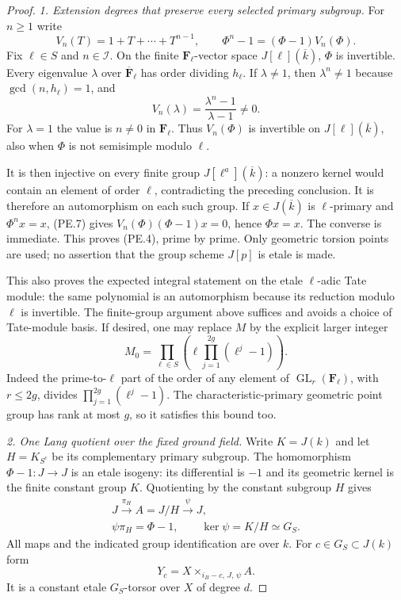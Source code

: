 \documentclass[11pt,a4paper]{article}
\begin{document}
\begin{proof}
\emph{1. Extension degrees that preserve every selected primary subgroup.}
For $n\ge1$ write
\[
 V_n(T)=1+T+\cdots+T^{n-1},\qquad
              \Phi^n-1=(\Phi-1)V_n(\Phi).
 \tag{PE.7}
\]
Fix $\ell\in S$ and $n\in\mathcal I$. On the finite
$\mathbf F_\ell$-vector space $J[\ell](\overline k)$,
$\Phi$ is invertible. Every eigenvalue $\lambda$ over
$\overline{\mathbf F}_\ell$ has order dividing $h_\ell$.
If $\lambda\ne1$, then $\lambda^n\ne1$ because
$\gcd(n,h_\ell)=1$, and
\[
 V_n(\lambda)=\frac{\lambda^n-1}{\lambda-1}\ne0.
\]
For $\lambda=1$ the value is $n\ne0$ in $\mathbf F_\ell$.
Thus $V_n(\Phi)$ is invertible on $J[\ell](\overline k)$,
also when $\Phi$ is not semisimple modulo $\ell$.

It is then injective on every finite group
$J[\ell^a](\overline k)$: a nonzero kernel would contain an
element of order $\ell$, contradicting the preceding conclusion.
It is therefore an automorphism on each such group. If
$x\in J(\overline k)$ is $\ell$-primary and $\Phi^n x=x$,
(PE.7) gives $V_n(\Phi)(\Phi-1)x=0$, hence $\Phi x=x$.
The converse is immediate. This proves (PE.4), prime by prime.
Only geometric torsion points are used; no assertion that the
group scheme $J[p]$ is etale is made.

This also proves the expected integral statement on the etale
$\ell$-adic Tate module: the same polynomial is an automorphism
because its reduction modulo $\ell$ is invertible. The finite-group
argument above suffices and avoids a choice of Tate-module basis.
If desired, one may replace $M$ by the explicit larger integer
\[
        M_0=\prod_{\ell\in S}
                   \left(\ell\prod_{j=1}^{2g}(\ell^j-1)\right).
 \tag{PE.8}
\]
Indeed the prime-to-$\ell$ part of the order of any element of
$\operatorname{GL}_r(\mathbf F_\ell)$, with $r\le2g$, divides
$\prod_{j=1}^{2g}(\ell^j-1)$. The characteristic-primary geometric
point group has rank at most $g$, so it satisfies this bound too.

\emph{2. One Lang quotient over the fixed ground field.}
Write $K=J(k)$ and let $H=K_{S^c}$ be its complementary primary
subgroup. The homomorphism $\Phi-1:J\to J$ is an etale isogeny:
its differential is $-1$ and its geometric kernel is the finite
constant group $K$. Quotienting by the constant subgroup $H$
gives
\[
 \begin{gathered}
 J\xrightarrow{\pi_H} A=J/H\xrightarrow{\psi}J,\\
       \psi\pi_H=\Phi-1,\qquad\ker\psi=K/H\simeq G_S.
 \end{gathered}
 \tag{PE.9}
\]
All maps and the indicated group identification are over $k$.
For $c\in G_S\subset J(k)$ form
\[
       Y_c=X\times_{i_B-c,\,J,\,\psi} A.
 \tag{PE.10}
\]
It is a constant etale $G_S$-torsor over $X$ of degree $d$.


\end{proof}
\end{document}
